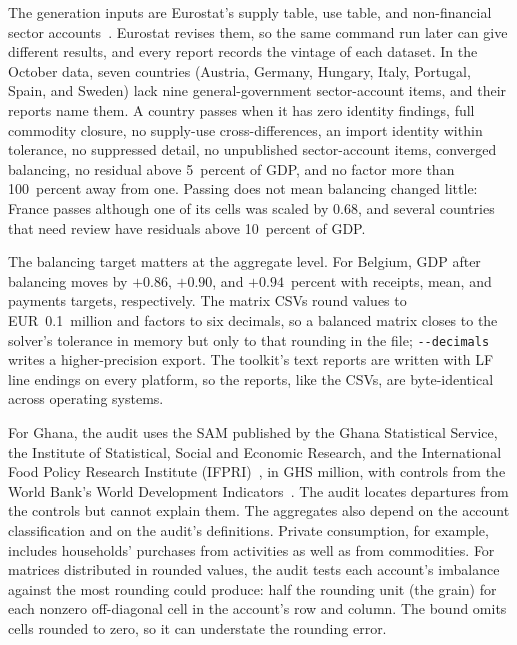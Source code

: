 \documentclass[11pt,a4paper]{article}
\begin{document}
The generation inputs are Eurostat's supply table, use table, and
non-financial sector accounts~\cite{eurostat_naio15,eurostat_naio16,eurostat_nasa}. Eurostat revises
them, so the same command run later can give different results, and every
report records the vintage of each dataset. In the October data, seven
countries (Austria, Germany, Hungary, Italy, Portugal,
Spain, and Sweden) lack nine general-government sector-account items, and
their reports name them. A country passes when it has zero identity
findings, full commodity closure, no supply-use cross-differences, an
import identity within tolerance, no suppressed detail, no unpublished
sector-account items, converged balancing, no residual above 5~percent of
GDP, and no factor more than 100~percent away from one. Passing does not
mean balancing changed little: France passes although one of its cells
was scaled by 0.68, and several countries that need review have residuals
above 10~percent of GDP.

The balancing target matters at the aggregate level. For Belgium, GDP
after balancing moves by $+0.86$, $+0.90$, and $+0.94$~percent with
receipts, mean, and payments targets, respectively. The matrix CSVs round
values to EUR~0.1~million and factors to six decimals, so a balanced matrix
closes to the solver's tolerance in memory but only to that rounding in
the file; \texttt{-{}-decimals} writes a higher-precision export. The
toolkit's text reports are written with LF line endings on every
platform, so the reports, like the CSVs, are byte-identical across
operating systems.

For Ghana, the audit uses the SAM published by the Ghana Statistical
Service, the Institute of Statistical, Social and Economic Research, and
the International Food Policy Research Institute (IFPRI)~\cite{gss2023ghana,gss2023ghanapaper}, in GHS million, with controls
from the World Bank's World Development Indicators~\cite{worldbank2026wdi}. The audit locates departures from the controls
but cannot explain them. The aggregates also depend on the
account classification and on the audit's definitions. Private
consumption, for example, includes households' purchases from activities
as well as from commodities. For matrices distributed in rounded values,
the audit tests each account's imbalance against the most rounding could
produce: half the rounding unit (the grain) for each nonzero off-diagonal
cell in the account's row and column. The bound omits cells rounded to
zero, so it can understate the rounding error.
\end{document}
